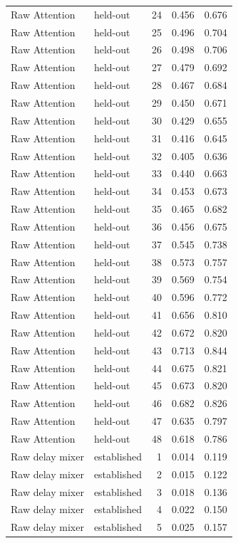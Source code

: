 \begin{tabular}{llrrr}
Raw Attention & held-out & 24 & 0.456 & 0.676 \\
Raw Attention & held-out & 25 & 0.496 & 0.704 \\
Raw Attention & held-out & 26 & 0.498 & 0.706 \\
Raw Attention & held-out & 27 & 0.479 & 0.692 \\
Raw Attention & held-out & 28 & 0.467 & 0.684 \\
Raw Attention & held-out & 29 & 0.450 & 0.671 \\
Raw Attention & held-out & 30 & 0.429 & 0.655 \\
Raw Attention & held-out & 31 & 0.416 & 0.645 \\
Raw Attention & held-out & 32 & 0.405 & 0.636 \\
Raw Attention & held-out & 33 & 0.440 & 0.663 \\
Raw Attention & held-out & 34 & 0.453 & 0.673 \\
Raw Attention & held-out & 35 & 0.465 & 0.682 \\
Raw Attention & held-out & 36 & 0.456 & 0.675 \\
Raw Attention & held-out & 37 & 0.545 & 0.738 \\
Raw Attention & held-out & 38 & 0.573 & 0.757 \\
Raw Attention & held-out & 39 & 0.569 & 0.754 \\
Raw Attention & held-out & 40 & 0.596 & 0.772 \\
Raw Attention & held-out & 41 & 0.656 & 0.810 \\
Raw Attention & held-out & 42 & 0.672 & 0.820 \\
Raw Attention & held-out & 43 & 0.713 & 0.844 \\
Raw Attention & held-out & 44 & 0.675 & 0.821 \\
Raw Attention & held-out & 45 & 0.673 & 0.820 \\
Raw Attention & held-out & 46 & 0.682 & 0.826 \\
Raw Attention & held-out & 47 & 0.635 & 0.797 \\
Raw Attention & held-out & 48 & 0.618 & 0.786 \\
Raw delay mixer & established & 1 & 0.014 & 0.119 \\
Raw delay mixer & established & 2 & 0.015 & 0.122 \\
Raw delay mixer & established & 3 & 0.018 & 0.136 \\
Raw delay mixer & established & 4 & 0.022 & 0.150 \\
Raw delay mixer & established & 5 & 0.025 & 0.157 \\

\end{tabular}
